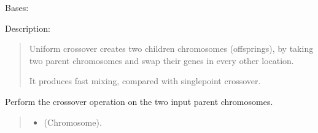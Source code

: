 \documentclass[letterpaper,10pt,english]{sphinxmanual}
\begin{document}
\begin{fulllineitems}
\label{\detokenize{pygenalgo.operators.crossover:pygenalgo.operators.crossover.uniform_crossover.UniformCrossover}}
\pysigstartsignatures
\pysiglinewithargsret
{}
{}
{}
\pysigstopsignatures
\sphinxAtStartPar
Bases: {\hyperref[\detokenize{pygenalgo.operators.crossover:pygenalgo.operators.crossover.crossover_operator.CrossoverOperator}]{}}

\sphinxAtStartPar
Description:
\begin{quote}

\sphinxAtStartPar
Uniform crossover creates two children chromosomes (offsprings),
by taking two parent chromosomes and swap their genes in every
other location.

\sphinxAtStartPar
It produces fast mixing, compared with single\sphinxhyphen{}point crossover.
\end{quote}

\begin{fulllineitems}
\label{\detokenize{pygenalgo.operators.crossover:pygenalgo.operators.crossover.uniform_crossover.UniformCrossover.crossover}}
\pysigstartsignatures
\pysiglinewithargsret
{}
{\sphinxparamcomma {}}
{}
\pysigstopsignatures
\sphinxAtStartPar
Perform the crossover operation on the two input parent chromosomes.
\begin{quote}\begin{description}
\begin{itemize}
\item {} 
\sphinxAtStartPar
{} \textendash{} (Chromosome).


\end{itemize}
\end{description}
\end{quote}
\end{fulllineitems}
\end{fulllineitems}
\end{document}
